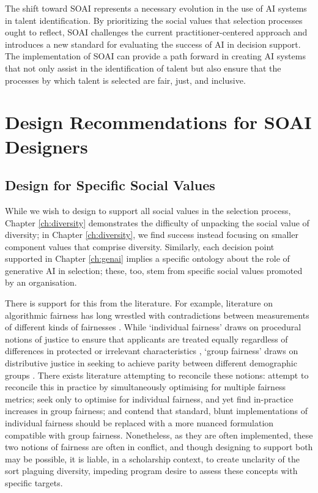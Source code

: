 The shift toward SOAI represents a necessary evolution in the use of AI systems in talent identification. By prioritizing the social values that selection processes ought to reflect, SOAI challenges the current practitioner-centered approach and introduces a new standard for evaluating the success of AI in decision support. The implementation of SOAI can provide a path forward in creating AI systems that not only assist in the identification of talent but also ensure that the processes by which talent is selected are fair, just, and inclusive.

\section{Design Recommendations for SOAI Designers}
\subsection{Design for Specific Social Values}
While we wish to design to support all social values in the selection process, Chapter \ref{ch:diversity} demonstrates the difficulty of unpacking the social value of diversity; in Chapter \ref{ch:diversity}, we find success instead focusing on smaller component values that comprise diversity. Similarly, each decision point supported in Chapter \ref{ch:genai} implies a specific ontology about the role of generative AI in selection; these, too, stem from specific social values promoted by an organisation.

There is support for this from the literature. For example, literature on algorithmic fairness has long wrestled with contradictions between measurements of different kinds of fairnesses \cite{pmlr-v80-kearns18a}. While `individual fairness' draws on procedural notions of justice to ensure that applicants are treated equally regardless of differences in protected or irrelevant characteristics \cite{dwork_fairness_2012}, `group fairness' draws on distributive justice in seeking to achieve parity between different demographic groups \cite{Citron_2008,Olsaretti_2018}. There exists literature attempting to reconcile these notions: \textcite{pmlr-v28-zemel13} attempt to reconcile this in practice by simultaneously optimising for multiple fairness metrics; \textcite{lahoti2019ifairlearningindividuallyfair} seek only to optimise for individual fairness, and yet find in-practice increases in group fairness; and \textcite{binns_apparent_2019} contend that standard, blunt implementations of individual fairness should be replaced with a more nuanced formulation compatible with group fairness. Nonetheless, as they are often implemented, these two notions of fairness are often in conflict, and though designing to support both may be possible, it is liable, in a scholarship context, to create unclarity of the sort plaguing diversity, impeding program desire to assess these concepts with specific targets. 

